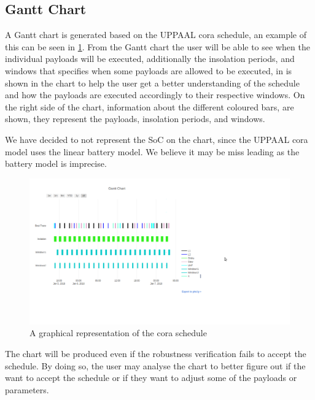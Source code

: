 \subsection{Gantt Chart} \label{subsec:gantt}
A Gantt chart is generated based on the UPPAAL \gls{cora} schedule, an example of this can be seen in \cref{fig:gantt}. From the Gantt chart the user will be able to see when the individual payloads will be executed, additionally the insolation periods, and windows that specifies when some payloads are allowed to be executed, in is shown in the chart to help the user get a better understanding of the schedule and how the payloads are executed accordingly to their respective windows. On the right side of the chart, information about the different coloured bars, are shown, they represent the payloads, insolation periods, and windows. 

We have decided to not represent the SoC on the chart, since the UPPAAL \gls{cora} model uses the linear battery model. We believe it may be miss leading as the battery model is imprecise. 

\begin{figure}[!h]
	\includegraphics[width=\textwidth]{graphics/gantt.png}
	\caption{A graphical representation of the \gls{cora} schedule}
	\label{fig:gantt}
\end{figure}
The chart will be produced even if the robustness verification fails to accept the schedule. By doing so, the user may analyse the chart to better figure out if the want to accept the schedule or if they want to adjust some of the payloads or parameters.
